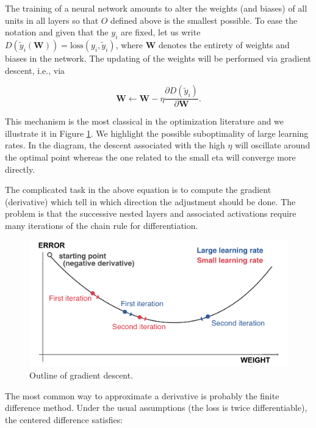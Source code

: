 \documentclass[]{krantz}
\theoremstyle{definition}
\theoremstyle{definition}
\theoremstyle{definition}
\theoremstyle{remark}
\begin{document}
The training of a neural network amounts to alter the weights (and
biases) of all units in all layers so that \(O\) defined above is the
smallest possible. To ease the notation and given that the \(y_i\) are
fixed, let us write
\(D(\tilde{y}_i(\textbf{W}))=\text{loss}(y_i,\tilde{y}_i)\), where
\(\textbf{W}\) denotes the entirety of weights and biases in the
network. The updating of the weights will be performed via gradient
descent, i.e., via

\begin{equation}
\label{eq:graddesc}
\textbf{W} \leftarrow \textbf{W}-\eta  \frac{\partial D(\tilde{y}_i) }{\partial \textbf{W}}.
\end{equation}

This mechanism is the most classical in the optimization literature and
we illustrate it in Figure \ref{fig:newton}. We highlight the possible
suboptimality of large learning rates. In the diagram, the descent
associated with the high \(\eta\) will oscillate around the optimal
point whereas the one related to the small eta will converge more
directly.

The complicated task in the above equation is to compute the gradient
(derivative) which tell in which direction the adjustment should be
done. The problem is that the successive nested layers and associated
activations require many iterations of the chain rule for
differentiation.

\begin{figure}[H]

{\centering \includegraphics[width=480px]{images/Newton} 

}

\caption{Outline of gradient descent.}\label{fig:newton}
\end{figure}

The most common way to approximate a derivative is probably the finite
difference method. Under the usual assumptions (the loss is twice
differentiable), the centered difference satisfies:
\end{document}
